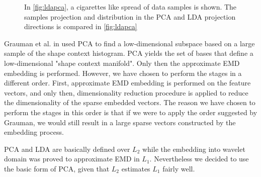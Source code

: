 \begin{figure}
	\centering
    \caption{In \ref{fig:ldapca}, a cigarettes like spread of data samples is shown. The samples projection and distribution in the PCA and LDA projection directions is compared in \ref{fig:ldapca}}
   \label{fig:cigarettes_data}
\end{figure}


\iftoggle{edit-mode}{\hspace{0pt}\marginpar{When to perform the DR?}}{}
Grauman et al. in \cite{grauman2004fast} used PCA to find a low-dimensional subspace based on a large sample of the shape context histogram. 
PCA yields the set of bases that define a low-dimensional "shape context manifold". 
Only then the approximate EMD embedding is performed. 
However, we have chosen to perform the stages in a different order. 
First, approximate EMD embedding is performed on the feature vectors, and only then, dimensionality reduction procedure is applied to reduce the dimensionality of the sparse embedded vectors. 
The reason we have chosen to perform the stages in this order is that if we were to apply the order suggested by Grauman, we would still result in a large sparse vectors constructed by the embedding process.
  
\iftoggle{edit-mode}{\hspace{0pt}\marginpar{Usage of PCA in the $L_1$ space.}}{}
PCA and LDA are basically defined over $L_2$ while the embedding into wavelet domain was proved to approximate EMD in $L_1$. 
Nevertheless we decided to use the basic form of PCA, given that $L_2$ estimates $L_1$ fairly well.

